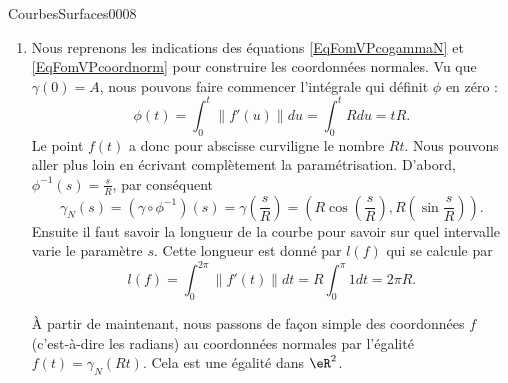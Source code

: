 \begin{corrige}{CourbesSurfaces0008}

	\begin{enumerate}
		\item
				
			Nous reprenons les indications des équations \eqref{EqFomVPcogammaN} et \eqref{EqFomVPcoordnorm} pour construire les coordonnées normales. Vu que $\gamma(0)=A$, nous pouvons faire commencer l'intégrale qui définit $\phi$ en zéro :
			\begin{equation}
				\phi(t)=\int_0^t\| f'(u) \|du=\int_0^t Rdu=tR.
			\end{equation}
			Le point $f(t)$ a donc pour abscisse curviligne le nombre $Rt$. Nous pouvons aller plus loin en écrivant complètement la paramétrisation. D'abord, $\phi^{-1}(s)=\frac{ s }{ R }$, par conséquent
			\begin{equation}
				\gamma_N(s)=(\gamma\circ\phi^{-1})(s)=\gamma(\frac{ s }{ R })=\left( R\cos(\frac{ s }{ R }),R(\sin\frac{ s }{ R }) \right).
			\end{equation}
			Ensuite il faut savoir la longueur de la courbe pour savoir sur quel intervalle varie le paramètre $s$. Cette longueur est donné par $l(f)$ qui se calcule par
			\begin{equation}
				l(f)=\int_0^{2\pi}\| f'(t) \|dt=R\int_0^{\pi}1dt=2\pi R.
			\end{equation}
	
			À partir de maintenant, nous passons de façon simple des coordonnées $f$ (c'est-à-dire les radians) au coordonnées normales par l'égalité $f(t)=\gamma_N(Rt)$. Cela est une égalité dans $\eR^2$.


\end{enumerate}
\end{corrige}
